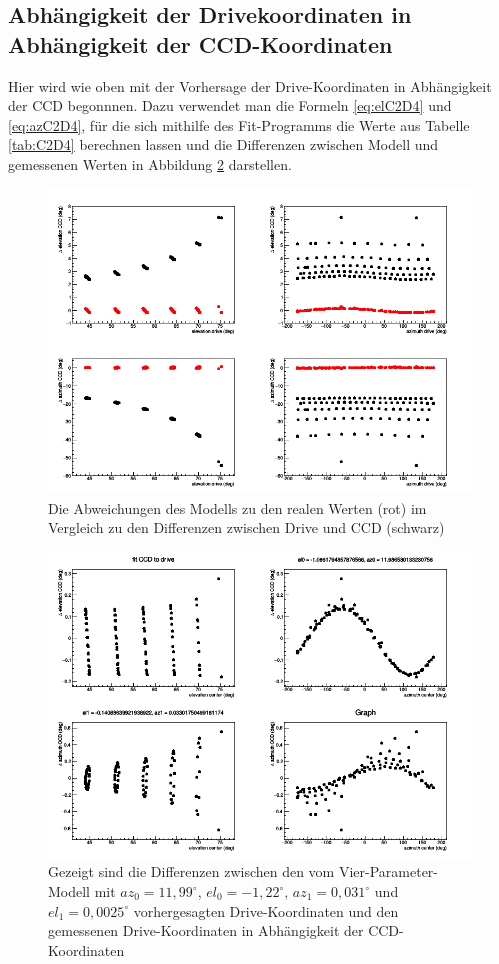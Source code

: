 \subsection{Abhängigkeit der Drivekoordinaten in Abhängigkeit der CCD-Koordinaten}
Hier wird wie oben mit der Vorhersage der Drive-Koordinaten in Abhängigkeit der CCD begonnnen. Dazu verwendet man die Formeln \ref{eq:elC2D4} und \ref{eq:azC2D4}, für die sich mithilfe des Fit-Programms die Werte aus Tabelle \ref{tab:C2D4} berechnen lassen und die Differenzen zwischen Modell und gemessenen Werten in Abbildung \ref{img:C2D4} darstellen.
\begin{figure}[htbp]
\centering
\includegraphics[width=\textwidth]{../341/C2D4comp.png}
\caption{Die Abweichungen des Modells zu den realen Werten (rot) im Vergleich zu den Differenzen zwischen Drive und CCD (schwarz)}
\label{img:C2D4comp}
\end{figure}
\begin{figure}[htbp]
\centering
\includegraphics[width=\textwidth]{../341/run341C2D_4par.png}
\caption{Gezeigt sind die Differenzen zwischen den vom Vier-Parameter-Modell mit $az_0=11,99^{\circ}$, $el_0=-1,22^{\circ}$, $az_1=0,031^{\circ}$ und $el_1=0,0025^{\circ}$ vorhergesagten Drive-Koordinaten und den gemessenen Drive-Koordinaten in Abhängigkeit der CCD-Koordinaten}
\label{img:C2D4}
\end{figure}
